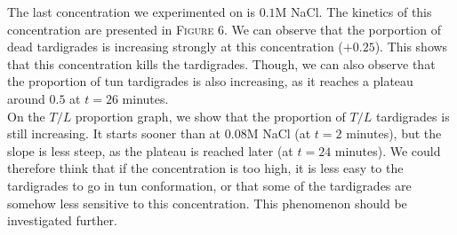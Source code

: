 \documentclass[12pt,a4paper, twocolumn]{article}
\begin{document}
The last concentration we experimented on is $0.1$M NaCl.  The kinetics of this concentration are presented in \textsc{Figure} 6. We can observe that the porportion of dead tardigrades is increasing strongly at this concentration ($+0.25$). This shows that this concentration kills the tardigrades. Though, we can also observe that the proportion of tun tardigrades is also increasing, as it reaches a plateau around $0.5$ at $t=26$ minutes.\\
On the $T/L$ proportion graph, we show that the proportion of $T/L$ tardigrades is still increasing. It starts sooner than at $0.08$M NaCl (at $t=2$ minutes), but the slope is less steep, as the plateau is reached later (at $t=24$ minutes). We could therefore think that if the concentration is too high, it is less easy to the tardigrades to go in tun conformation, or that some of the tardigrades are somehow less sensitive to this concentration. This phenomenon should be investigated further.
\end{document}
